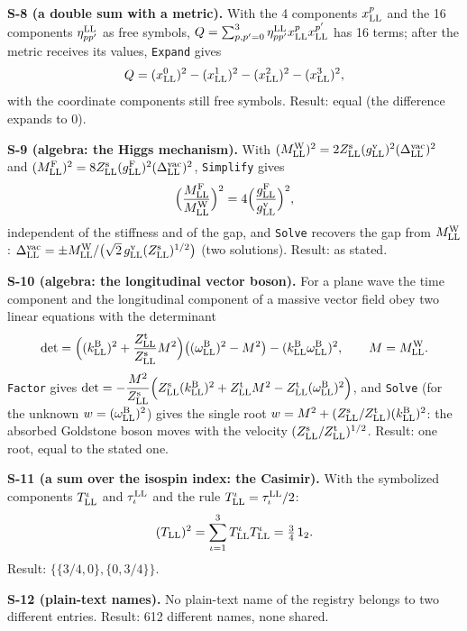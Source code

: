 \documentclass[
  10pt,
]{article}
\begin{document}
\textbf{S-8 (a double sum with a metric).} With the 4 components
\(x^p_{\rm LL}\) and the 16 components \(\eta^{\rm LL}_{pp'}\) as free
symbols,
\(Q=\sum_{p,p'=0}^{3}\eta^{\rm LL}_{pp'}x^p_{\rm LL}x^{p'}_{\rm LL}\)
has 16 terms; after the metric receives its values, \texttt{Expand}
gives
\[Q=(x^0_{\rm LL})^2-(x^1_{\rm LL})^2-(x^2_{\rm LL})^2-(x^3_{\rm LL})^2,\]
with the coordinate components still free symbols. Result: equal (the
difference expands to 0).

\textbf{S-9 (algebra: the Higgs mechanism).} With
\((M^{\rm W}_{\rm LL})^2=2Z^{\rm s}_{\rm LL}(g^{\rm v}_{\rm LL})^2(\Delta^{\rm vac}_{\rm LL})^2\)
and
\((M^{\rm F}_{\rm LL})^2=8Z^{\rm s}_{\rm LL}(g^{\rm F}_{\rm LL})^2(\Delta^{\rm vac}_{\rm LL})^2\),
\texttt{Simplify} gives
\[\Big(\frac{M^{\rm F}_{\rm LL}}{M^{\rm W}_{\rm LL}}\Big)^2=4\Big(\frac{g^{\rm F}_{\rm LL}}{g^{\rm v}_{\rm LL}}\Big)^2,\]
independent of the stiffness and of the gap, and \texttt{Solve} recovers
the gap from \(M^{\rm W}_{\rm LL}\):
\(\Delta^{\rm vac}_{\rm LL}=\pm M^{\rm W}_{\rm LL}/\big(\sqrt2\,g^{\rm v}_{\rm LL}(Z^{\rm s}_{\rm LL})^{1/2}\big)\)
(two solutions). Result: as stated.

\textbf{S-10 (algebra: the longitudinal vector boson).} For a plane wave
the time component and the longitudinal component of a massive vector
field obey two linear equations with the determinant
\[\det=\Big((k^{\rm B}_{\rm LL})^2+\frac{Z^{\rm t}_{\rm LL}}{Z^{\rm s}_{\rm LL}}M^2\Big)\big((\omega^{\rm B}_{\rm LL})^2-M^2\big)-(k^{\rm B}_{\rm LL}\omega^{\rm B}_{\rm LL})^2,\qquad M=M^{\rm W}_{\rm LL}.\]
\texttt{Factor} gives
\(\det=-\dfrac{M^2}{Z^{\rm s}_{\rm LL}}\Big(Z^{\rm s}_{\rm LL}(k^{\rm B}_{\rm LL})^2+Z^{\rm t}_{\rm LL}M^2-Z^{\rm t}_{\rm LL}(\omega^{\rm B}_{\rm LL})^2\Big)\),
and \texttt{Solve} (for the unknown \(w=(\omega^{\rm B}_{\rm LL})^2\))
gives the single root
\(w=M^2+(Z^{\rm s}_{\rm LL}/Z^{\rm t}_{\rm LL})(k^{\rm B}_{\rm LL})^2\):
the absorbed Goldstone boson moves with the velocity
\((Z^{\rm s}_{\rm LL}/Z^{\rm t}_{\rm LL})^{1/2}\). Result: one root,
equal to the stated one.

\textbf{S-11 (a sum over the isospin index: the Casimir).} With the
symbolized components \(T^\iota_{\rm LL}\) and \(\tau^{\rm LL}_\iota\)
and the rule \(T^\iota_{\rm LL}=\tau^{\rm LL}_\iota/2\):
\[(T_{\rm LL})^2=\sum_{\iota=1}^3T^\iota_{\rm LL}T^\iota_{\rm LL}=\tfrac34\,\mathsf 1_2 .\]
Result: \(\{\{3/4,0\},\{0,3/4\}\}\).

\textbf{S-12 (plain-text names).} No plain-text name of the registry
belongs to two different entries. Result: 612 different names, none
shared.
\end{document}
